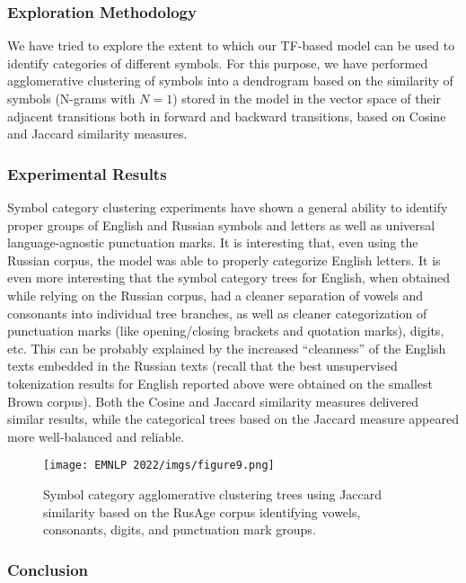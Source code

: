 \documentclass[11pt]{article}
\begin{document}
\subsubsection{Exploration Methodology}

We have tried to explore the extent to which our TF-based model can be used to identify categories of different symbols. For this purpose, we have performed agglomerative clustering of symbols into a dendrogram based on the similarity of symbols (N-grams with $N=1$) stored in the model in the vector space of their adjacent transitions both in forward and backward transitions, based on Cosine and Jaccard similarity measures.

\subsubsection{Experimental Results}

Symbol category clustering experiments have shown a general ability to identify proper groups of English and Russian symbols and letters as well as universal language-agnostic punctuation marks. It is interesting that, even using the Russian corpus, the model was able to properly categorize English letters. It is even more interesting that the symbol category trees for English, when obtained while relying on the Russian corpus, had a cleaner separation of vowels and consonants into individual tree branches, as well as cleaner categorization of punctuation marks (like opening/closing brackets and quotation marks), digits, etc. This can be probably explained by the increased “cleanness” of the English texts embedded in the Russian texts (recall that the best unsupervised tokenization results for English reported above were obtained on the smallest Brown corpus). Both the Cosine and Jaccard similarity measures delivered  similar results, while the categorical trees based on the Jaccard measure appeared more well-balanced and reliable.

\begin{figure}
  \texttt{[image: EMNLP 2022/imgs/figure9.png]}
  \caption{Symbol category agglomerative clustering trees using Jaccard similarity based on the RusAge corpus identifying vowels, consonants, digits, and punctuation mark groups.}
\end{figure}

\subsubsection{Conclusion}
\end{document}
